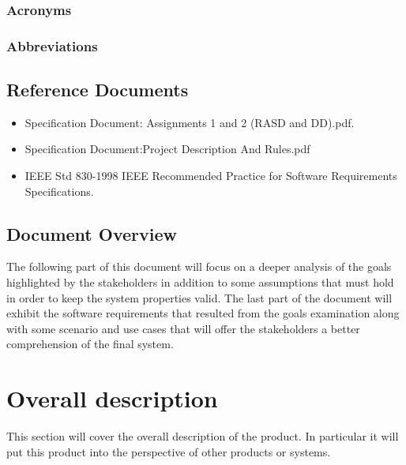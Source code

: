 \documentclass[11pt, a4paper,titlepage]{article}
\begin{document}
\subsubsection{Acronyms}
\subsubsection{Abbreviations}
\subsection{Reference Documents}
	\begin{itemize}
		\item Specification Document: Assignments 1 and 2 (RASD and DD).pdf.
		\item Specification Document:Project Description And Rules.pdf
		\item IEEE Std 830-1998 IEEE Recommended Practice for Software Requirements Specifications.
		
	\end{itemize}
\subsection{Document Overview}
The following part of this document will focus on a deeper analysis of the goals highlighted by the stakeholders in addition to some assumptions that must hold in order to keep the system properties valid. The last part of the document will exhibit the software requirements that resulted from the goals examination along with some scenario and use cases that will offer the stakeholders a better comprehension of the final system.   
\pagebreak
\section{Overall description}
This section will cover the overall description of the product. In particular it will put this product into the perspective of other products or systems. 
\end{document}

